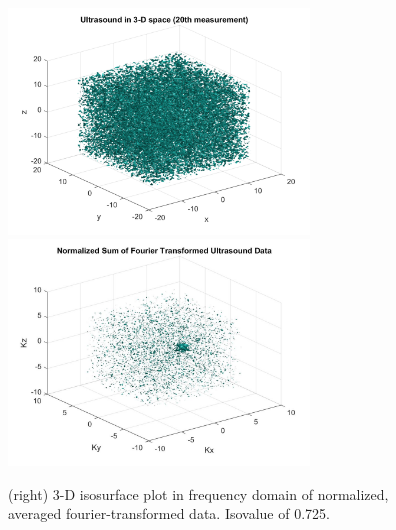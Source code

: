 \documentclass{article}
\begin{document}
\begin{figure}[H]
\begin{center}
\includegraphics[width = 8cm]{sample3d}
\includegraphics[width = 8cm]{fourieravg}
\caption{\label{fig:scaled_diss} (left) 3-D isosurface plot in space of the ultrasound at the 20th time point. Isovalue of 0.75.}
\caption{\label{fig:scaled_diss} (right) 3-D isosurface plot in frequency domain of normalized, averaged fourier-transformed data. Isovalue of 0.725.}
\end{center}
\end{figure}
\end{document}
